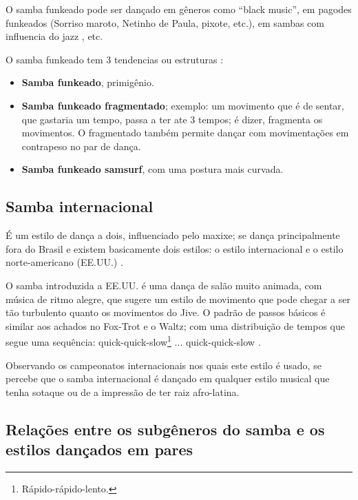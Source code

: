 O samba funkeado pode ser dançado em gêneros como ``black music'',
em pagodes funkeados (Sorriso maroto, Netinho de Paula, pixote, etc.), 
em sambas com influencia do jazz \cite{sambafunkeadoJimmyDeOliveiraPart3}, etc.

O samba funkeado tem 3 tendencias ou estruturas  \cite{sambafunkeadoJimmyDeOliveiraPart2}:
\begin{itemize}
\item \textbf{Samba funkeado}, primigênio.
\item \textbf{Samba funkeado fragmentado}; exemplo: um movimento que é de sentar, que gastaria um tempo, 
passa a ter ate 3 tempos; é dizer, fragmenta os movimentos. 
O fragmentado também permite dançar com movimentações em contrapeso no par de dança.
\item \textbf{Samba funkeado samsurf}, com uma postura mais curvada.
\end{itemize}

 
\subsection{Samba internacional}
\label{subsec:DancaSambaInternacional} 
É um estilo de dança a dois, influenciado pelo maxixe;
se dança principalmente fora do Brasil e existem basicamente dois estilos: 
o estilo internacional e o estilo norte-americano (EE.UU.) \cite[pp. 134-135]{perna2002samba}.

O samba introduzida a EE.UU. é uma dança de salão muito animada, 
com música de ritmo alegre, que sugere um estilo de movimento que pode
chegar a ser tão turbulento quanto os movimentos do Jive.
O padrão de passos básicos é similar aos achados no Fox-Trot e o Waltz;
com uma distribuição de tempos que segue uma sequência: 
quick-quick-slow\footnote{Rápido-rápido-lento.} ... quick-quick-slow \cite{parson2016ballroom}.

Observando os campeonatos internacionais nos quais este estilo é usado, 
se percebe que o samba internacional é dançado em qualquer estilo musical que
tenha sotaque ou de a impressão de ter raiz afro-latina.

\subsection{Relações entre os subgêneros do samba e os estilos dançados em pares}

